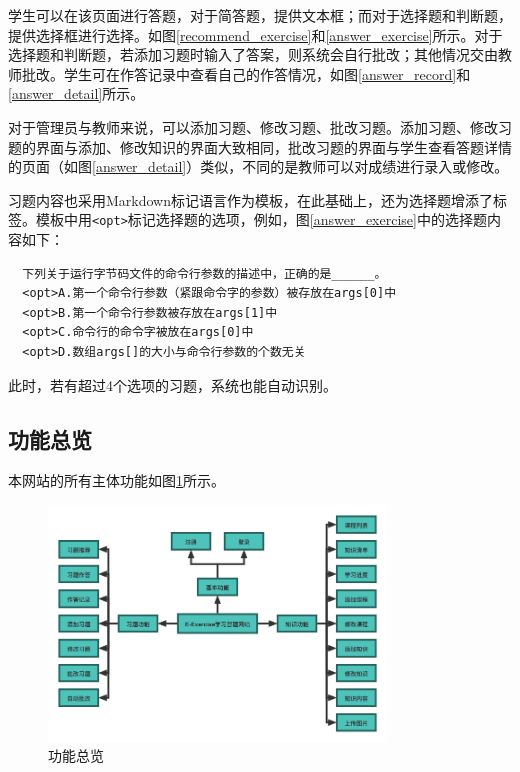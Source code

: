 \documentclass{nwafucoursepaper}
\begin{document}
学生可以在该页面进行答题，对于简答题，提供文本框；而对于选择题和判断题，提供选择框进行选择。如图\ref{recommend_exercise}和\ref{answer_exercise}所示。对于选择题和判断题，若添加习题时输入了答案，则系统会自行批改；其他情况交由教师批改。学生可在作答记录中查看自己的作答情况，如图\ref{answer_record}和\ref{answer_detail}所示。

对于管理员与教师来说，可以添加习题、修改习题、批改习题。添加习题、修改习题的界面与添加、修改知识的界面大致相同，批改习题的界面与学生查看答题详情的页面（如图\ref{answer_detail}）类似，不同的是教师可以对成绩进行录入或修改。

习题内容也采用Markdown标记语言作为模板，在此基础上，还为选择题增添了标签。模板中用\verb|<opt>|标记选择题的选项，例如，图\ref{answer_exercise}中的选择题内容如下：
\begin{lstlisting}
  下列关于运行字节码文件的命令行参数的描述中，正确的是______。
  <opt>A.第一个命令行参数（紧跟命令字的参数）被存放在args[0]中
  <opt>B.第一个命令行参数被存放在args[1]中
  <opt>C.命令行的命令字被放在args[0]中
  <opt>D.数组args[]的大小与命令行参数的个数无关
\end{lstlisting}
此时，若有超过4个选项的习题，系统也能自动识别。

\newpage

\subsection{功能总览}

本网站的所有主体功能如图\ref{功能总览图}所示。

\begin{figure}[htp]
  \centering
  \includegraphics[width=0.8\textwidth]{功能总览图.png}
  \caption{功能总览}
  \label{功能总览图}
\end{figure}

\end{document}

